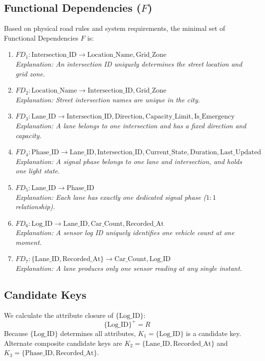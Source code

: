\documentclass[11pt,a4paper]{article}
\begin{document}
\subsection{Functional Dependencies ($F$)}
Based on physical road rules and system requirements, the minimal set of Functional Dependencies $F$ is:
\begin{enumerate}
    \item $FD_1: \text{Intersection\_ID} \rightarrow \text{Location\_Name}, \text{Grid\_Zone}$ \\
    \textit{Explanation: An intersection ID uniquely determines the street location and grid zone.}
    \item $FD_2: \text{Location\_Name} \rightarrow \text{Intersection\_ID}, \text{Grid\_Zone}$ \\
    \textit{Explanation: Street intersection names are unique in the city.}
    \item $FD_3: \text{Lane\_ID} \rightarrow \text{Intersection\_ID}, \text{Direction}, \text{Capacity\_Limit}, \text{Is\_Emergency}$ \\
    \textit{Explanation: A lane belongs to one intersection and has a fixed direction and capacity.}
    \item $FD_4: \text{Phase\_ID} \rightarrow \text{Lane\_ID}, \text{Intersection\_ID}, \text{Current\_State}, \text{Duration}, \text{Last\_Updated}$ \\
    \textit{Explanation: A signal phase belongs to one lane and intersection, and holds one light state.}
    \item $FD_5: \text{Lane\_ID} \rightarrow \text{Phase\_ID}$ \\
    \textit{Explanation: Each lane has exactly one dedicated signal phase ($1:1$ relationship).}
    \item $FD_6: \text{Log\_ID} \rightarrow \text{Lane\_ID}, \text{Car\_Count}, \text{Recorded\_At}$ \\
    \textit{Explanation: A sensor log ID uniquely identifies one vehicle count at one moment.}
    \item $FD_7: \{\text{Lane\_ID}, \text{Recorded\_At}\} \rightarrow \text{Car\_Count}, \text{Log\_ID}$ \\
    \textit{Explanation: A lane produces only one sensor reading at any single instant.}
\end{enumerate}

\subsection{Candidate Keys}
We calculate the attribute closure of $\{\text{Log\_ID}\}$:
$$\{\text{Log\_ID}\}^+ = R$$
Because $\{\text{Log\_ID}\}$ determines all attributes, $K_1 = \{\text{Log\_ID}\}$ is a candidate key. Alternate composite candidate keys are $K_2 = \{\text{Lane\_ID}, \text{Recorded\_At}\}$ and $K_3 = \{\text{Phase\_ID}, \text{Recorded\_At}\}$.
\end{document}
